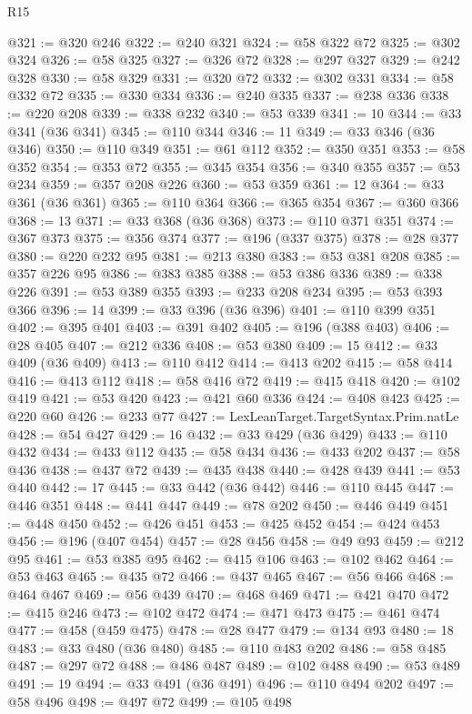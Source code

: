 \begin{lexlean}{R15}
\begin{coremodule}
@321 := @320 @246
@322 := @240 @321
@324 := @58 @322 @72
@325 := @302 @324
@326 := @58 @325
@327 := @326 @72
@328 := @297 @327
@329 := @242 @328
@330 := @58 @329
@331 := @320 @72
@332 := @302 @331
@334 := @58 @332 @72
@335 := @330 @334
@336 := @240 @335
@337 := @238 @336
@338 := @220 @208
@339 := @338 @232
@340 := @53 @339
@341 := 10
@344 := @33 @341 (@36 @341)
@345 := @110 @344
@346 := 11
@349 := @33 @346 (@36 @346)
@350 := @110 @349
@351 := @61 @112
@352 := @350 @351
@353 := @58 @352
@354 := @353 @72
@355 := @345 @354
@356 := @340 @355
@357 := @53 @234
@359 := @357 @208 @226
@360 := @53 @359
@361 := 12
@364 := @33 @361 (@36 @361)
@365 := @110 @364
@366 := @365 @354
@367 := @360 @366
@368 := 13
@371 := @33 @368 (@36 @368)
@373 := @110 @371 @351
@374 := @367 @373
@375 := @356 @374
@377 := @196 (@337 @375)
@378 := @28 @377
@380 := @220 @232 @95
@381 := @213 @380
@383 := @53 @381 @208
@385 := @357 @226 @95
@386 := @383 @385
@388 := @53 @386 @336
@389 := @338 @226
@391 := @53 @389 @355
@393 := @233 @208 @234
@395 := @53 @393 @366
@396 := 14
@399 := @33 @396 (@36 @396)
@401 := @110 @399 @351
@402 := @395 @401
@403 := @391 @402
@405 := @196 (@388 @403)
@406 := @28 @405
@407 := @212 @336
@408 := @53 @380
@409 := 15
@412 := @33 @409 (@36 @409)
@413 := @110 @412
@414 := @413 @202
@415 := @58 @414
@416 := @413 @112
@418 := @58 @416 @72
@419 := @415 @418
@420 := @102 @419
@421 := @53 @420
@423 := @421 @60 @336
@424 := @408 @423
@425 := @220 @60
@426 := @233 @77
@427 := LexLeanTarget.TargetSyntax.Prim.natLe
@428 := @54 @427
@429 := 16
@432 := @33 @429 (@36 @429)
@433 := @110 @432
@434 := @433 @112
@435 := @58 @434
@436 := @433 @202
@437 := @58 @436
@438 := @437 @72
@439 := @435 @438
@440 := @428 @439
@441 := @53 @440
@442 := 17
@445 := @33 @442 (@36 @442)
@446 := @110 @445
@447 := @446 @351
@448 := @441 @447
@449 := @78 @202
@450 := @446 @449
@451 := @448 @450
@452 := @426 @451
@453 := @425 @452
@454 := @424 @453
@456 := @196 (@407 @454)
@457 := @28 @456
@458 := @49 @93
@459 := @212 @95
@461 := @53 @385 @95
@462 := @415 @106
@463 := @102 @462
@464 := @53 @463
@465 := @435 @72
@466 := @437 @465
@467 := @56 @466
@468 := @464 @467
@469 := @56 @439
@470 := @468 @469
@471 := @421 @470
@472 := @415 @246
@473 := @102 @472
@474 := @471 @473
@475 := @461 @474
@477 := @458 (@459 @475)
@478 := @28 @477
@479 := @134 @93
@480 := 18
@483 := @33 @480 (@36 @480)
@485 := @110 @483 @202
@486 := @58 @485
@487 := @297 @72
@488 := @486 @487
@489 := @102 @488
@490 := @53 @489
@491 := 19
@494 := @33 @491 (@36 @491)
@496 := @110 @494 @202
@497 := @58 @496
@498 := @497 @72
@499 := @105 @498

\end{coremodule}
\end{lexlean}

